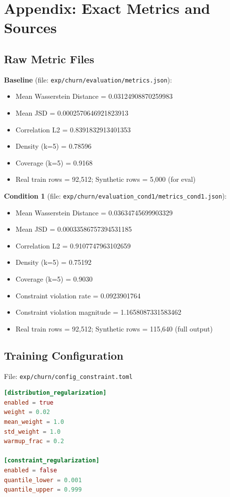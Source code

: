 \documentclass{article}
\begin{document}
\appendix

\section{Appendix: Exact Metrics and Sources}

\subsection{Raw Metric Files}

\textbf{Baseline} (file: \texttt{exp/churn/evaluation/metrics.json}):
\begin{itemize}
  \item Mean Wasserstein Distance = 0.03124908870259983
  \item Mean JSD = 0.0002570646921823913
  \item Correlation L2 = 0.8391832913401353
  \item Density (k=5) = 0.78596
  \item Coverage (k=5) = 0.9168
  \item Real train rows = 92,512; Synthetic rows = 5,000 (for eval)
\end{itemize}

\textbf{Condition 1} (file: \texttt{exp/churn/evaluation\_cond1/metrics\_cond1.json}):
\begin{itemize}
  \item Mean Wasserstein Distance = 0.03634745699903329
  \item Mean JSD = 0.00033586757394531185
  \item Correlation L2 = 0.9107747963102659
  \item Density (k=5) = 0.75192
  \item Coverage (k=5) = 0.9030
  \item Constraint violation rate = 0.0923901764
  \item Constraint violation magnitude = 1.1658087331583462
  \item Real train rows = 92,512; Synthetic rows = 115,640 (full output)
\end{itemize}

\subsection{Training Configuration}

File: \texttt{exp/churn/config\_constraint.toml}

\begin{lstlisting}[language=toml]
[distribution_regularization]
enabled = true
weight = 0.02
mean_weight = 1.0
std_weight = 1.0
warmup_frac = 0.2

[constraint_regularization]
enabled = false
quantile_lower = 0.001
quantile_upper = 0.999
\end{lstlisting}
\end{document}
